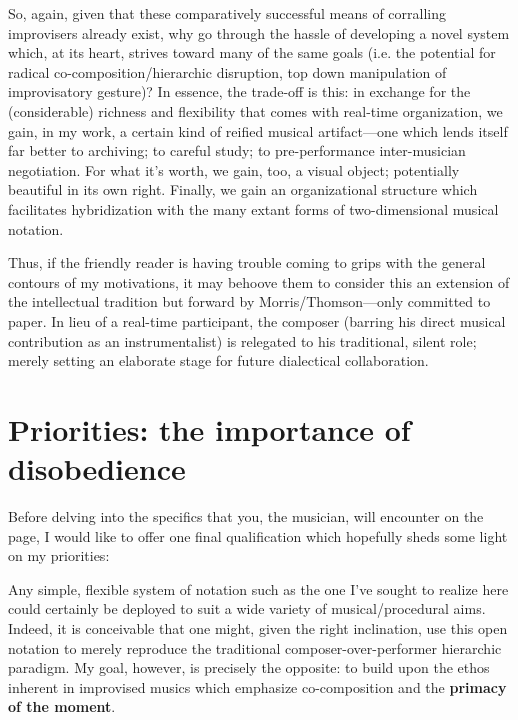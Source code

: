 \documentclass[twoside, 11pt]{book}
\begin{document}
        So, again, given that these comparatively successful means of corralling improvisers already exist, why go through the hassle of developing a novel system which, at its heart, strives toward many of the same goals (i.e. the potential for radical co-composition/hierarchic disruption, top down manipulation of improvisatory gesture)? In essence, the trade-off is this: in exchange for the (considerable) richness and flexibility that comes with real-time organization, we gain, in my work, a certain kind of reified musical artifact---one which lends itself far better to archiving; to careful study; to pre-performance inter-musician negotiation. For what it's worth, we gain, too, a visual object; potentially beautiful in its own right. Finally, we gain an organizational structure which facilitates hybridization with the many extant forms of two-dimensional musical notation.
        
        Thus, if the friendly reader is having trouble coming to grips with the general contours of my motivations, it may behoove them to consider this an extension of the intellectual tradition but forward by Morris/Thomson---only committed to paper. In lieu of a real-time participant, the composer (barring his direct musical contribution as an instrumentalist) is relegated to his traditional, silent role; merely setting an elaborate stage for future dialectical collaboration.
        
    \section{Priorities: the importance of disobedience}

    Before delving into the specifics that you, the musician, will encounter on the page, I would like to offer one final qualification which hopefully sheds some light on my priorities:
    
    Any simple, flexible system of notation such as the one I've sought to realize here could certainly be deployed to suit a wide variety of musical/procedural aims. Indeed, it is conceivable that one might, given the right inclination, use this open notation to merely reproduce the traditional composer-over-performer hierarchic paradigm. My goal, however, is precisely the opposite: to build upon the ethos inherent in improvised musics which emphasize co-composition and the \textbf{primacy of the moment}.
    
\end{document}
